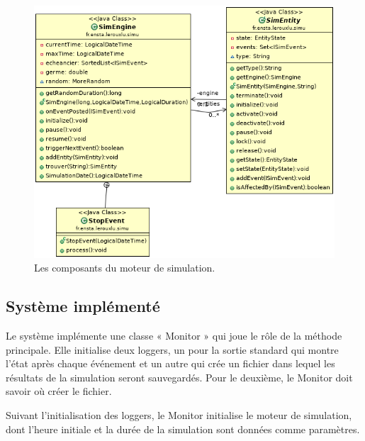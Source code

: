 \documentclass[12pt]{article} %
\begin{document}
\begin{figure}
	\centering
	\includegraphics[width=0.9\linewidth]{UML_moteur.png}
	\caption{Les composants du moteur de simulation.}
	\label{fig:UML_moteur}
\end{figure}

\subsection{Système implémenté}
Le système implémente une classe « Monitor » qui joue le rôle de la méthode principale. Elle initialise deux loggers, un pour la sortie standard qui montre l'état après chaque événement et un autre qui crée un fichier dans lequel les résultats de la simulation seront sauvegardés. Pour le deuxième, le Monitor doit savoir où créer le fichier.

Suivant l'initialisation des loggers, le Monitor initialise le moteur de simulation, dont l'heure initiale et la durée de la simulation sont données comme paramètres. 
\end{document}

